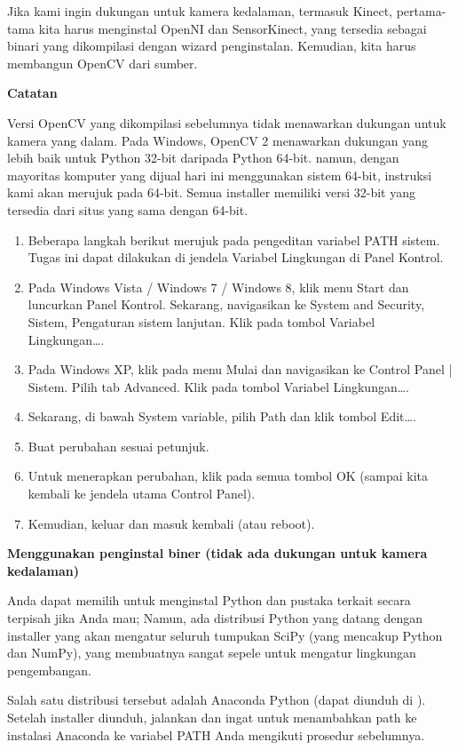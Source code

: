 Jika kami ingin dukungan untuk kamera kedalaman, termasuk Kinect, pertama-tama kita harus menginstal OpenNI dan SensorKinect, yang tersedia sebagai binari yang dikompilasi dengan wizard penginstalan. Kemudian, kita harus membangun OpenCV dari sumber.

\textbf{Catatan}

Versi OpenCV yang dikompilasi sebelumnya tidak menawarkan dukungan untuk kamera yang dalam. Pada Windows, OpenCV 2 menawarkan dukungan yang lebih baik untuk Python 32-bit daripada Python 64-bit. namun, dengan mayoritas komputer yang dijual hari ini menggunakan sistem 64-bit, instruksi kami akan merujuk pada 64-bit. Semua installer memiliki versi 32-bit yang tersedia dari situs yang sama dengan 64-bit.

\begin{enumerate}
	\item Beberapa langkah berikut merujuk pada pengeditan variabel PATH sistem. Tugas ini dapat dilakukan di jendela Variabel Lingkungan di Panel Kontrol.
	\item Pada Windows Vista / Windows 7 / Windows 8, klik menu Start dan luncurkan Panel Kontrol. Sekarang, navigasikan ke System and Security, Sistem, Pengaturan sistem lanjutan. Klik pada tombol Variabel Lingkungan….
	\item Pada Windows XP, klik pada menu Mulai dan navigasikan ke Control Panel | Sistem. Pilih tab Advanced. Klik pada tombol Variabel Lingkungan….
	\item Sekarang, di bawah System variable, pilih Path dan klik tombol Edit….
	\item Buat perubahan sesuai petunjuk.
	\item Untuk menerapkan perubahan, klik pada semua tombol OK (sampai kita kembali ke jendela utama Control Panel).
	\item Kemudian, keluar dan masuk kembali (atau reboot).
\end{enumerate}

\newpage
\textbf{Menggunakan penginstal biner (tidak ada dukungan untuk kamera kedalaman)}

Anda dapat memilih untuk menginstal Python dan pustaka terkait secara terpisah jika Anda mau; Namun, ada distribusi Python yang datang dengan installer yang akan mengatur seluruh tumpukan SciPy (yang mencakup Python dan NumPy), yang membuatnya sangat sepele untuk mengatur lingkungan pengembangan.
	
Salah satu distribusi tersebut adalah Anaconda Python (dapat diunduh di ). Setelah installer diunduh, jalankan dan ingat untuk menambahkan path ke instalasi Anaconda ke variabel PATH Anda mengikuti prosedur sebelumnya.

